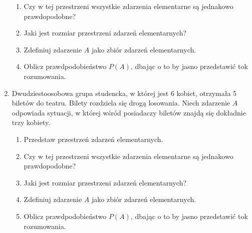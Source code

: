 \documentclass{mwart}
\newcommand{\ans}[1]{}
\newcommand{\ans}[1]{\emph{Odpowiedź:} #1}
\begin{document}
\begin{enumerate}
\begin{enumerate}
\item Czy w tej przestrzeni wszystkie zdarzenia elementarne są jednakowo prawdopodobne? \ans{Tak}%
\item Jaki jest rozmiar przestrzeni zdarzeń elementarnych? \ans{$\left|\Omega\right|=10^7$}%
\item Zdefiniuj zdarzenie $A$ jako zbiór zdarzeń elementarnych. \ans{$A=\{\omega_{i_1,\ldots,i_7}|\forall j,k\colon j\neq k\to i_j\neq i_k\}, \left|A\right|=\frac{10!}{3!}=604800$}%
\item Oblicz prawdpodobieństwo $P(A)$, dbając o to by jasno przedstawić tok rozumowania. \ans{$P(A)=\frac{604800}{10^7}=0{,}06$}%
\end{enumerate}%
\item Dwudziestoosobowa grupa studencka, w której jest 6 kobiet, otrzymała 5 biletów do teatru. Bilety rozdziela się drogą losowania. Niech zdarzenie $A$ odpowiada sytuacji, w której wśród posiadaczy biletów znajdą się dokładnie trzy kobiety.
\begin{enumerate}%
\item Przedstaw przestrzeń zdarzeń elementarnych. \ans{$\Omega=\{\omega_J|\left|J\right|=5 \land J\subset\{1,2,\ldots,20\}\}$}%
\item Czy w tej przestrzeni wszystkie zdarzenia elementarne są jednakowo prawdopodobne? \ans{Tak}%
\item Jaki jest rozmiar przestrzeni zdarzeń elementarnych? \ans{$\left|\Omega\right|={20\choose 5}=15504$}%
\item Zdefiniuj zdarzenie $A$ jako zbiór zdarzeń elementarnych. \ans{$A=\{\omega_J|\left|J\cap \{1,2,\ldots,6\}\right|=3\}, \left|A\right|={6\choose 3}{14\choose 2}=1820$}%
\item Oblicz prawdpodobieństwo $P(A)$, dbając o to by jasno przedstawić tok rozumowania. \ans{$P(A)=0{,}12$}%
\end{enumerate}%
\end{enumerate}%
\clearpage
\end{document}
